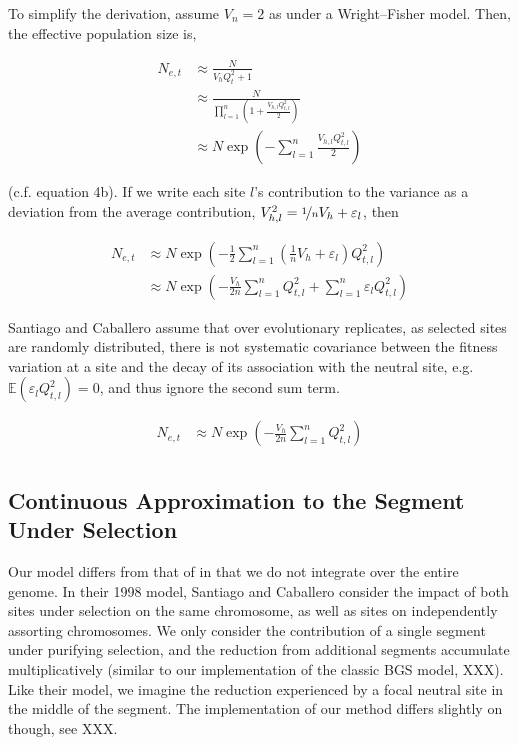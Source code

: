 \documentclass[11pt]{article}
\newcommand{\E}{\mathbb{E}}
\begin{document}
To simplify the derivation, assume $V_n = 2$ as under a Wright--Fisher model.
Then, the effective population size is,

\begin{align}
  N_{e,t} &\approx \frac{N}{V_h Q_t^2 + 1} \\
          &\approx \frac{N}{\prod_{l=1}^n \left(1 + \frac{V_{h,l} Q_{t,l}^2}{2}\right)} \\
          &\approx N \exp\left(- \sum_{l=1}^n \frac{V_{h,l} Q_{t,l}^2}{2}\right)
\end{align}

(c.f. \cite{Santiago1998-bs} equation 4b). If we write each site $l$'s
contribution to the variance as a deviation from the average contribution,
$V_{h,l}^2 = \nicefrac{1}{n} V_h + \varepsilon_l$, then 

\begin{align}
  N_{e,t} &\approx N \exp\left(- \frac{1}{2}\sum_{l=1}^n \left(\frac{1}{n}V_{h} + \varepsilon_l\right)  Q_{t,l}^2\right) \\
          &\approx N \exp\left(- \frac{V_{h}}{2n} \sum_{l=1}^n Q_{t,l}^2+ \sum_{l=1}^n \varepsilon_l  Q_{t,l}^2\right)
\end{align}

Santiago and Caballero assume that over evolutionary replicates, as selected
sites are randomly distributed, there is not systematic covariance between the
fitness variation at a site and the decay of its association with the neutral
site, e.g. $\E(\varepsilon_l Q_{t,l}^2) = 0$, and thus ignore the second sum
term. 

\begin{align}
      N_{e,t} &\approx N \exp\left(- \frac{V_{h}}{2n} \sum_{l=1}^n Q_{t,l}^2\right) \\
\end{align}

\subsection*{Continuous Approximation to the Segment Under Selection}

Our model differs from that of \textcite{Santiago1998-bs} in that we do not
integrate over the entire genome. In their 1998 model, Santiago and Caballero
consider the impact of both sites under selection on the same chromosome, as
well as sites on independently assorting chromosomes. We only consider the
contribution of a single segment under purifying selection, and the reduction
from additional segments accumulate multiplicatively (similar to our
implementation of the classic BGS model, XXX). Like their model, we imagine the
reduction experienced by a focal neutral site in the middle of the segment.
The implementation of our method differs slightly on though, see XXX.
\end{document}
